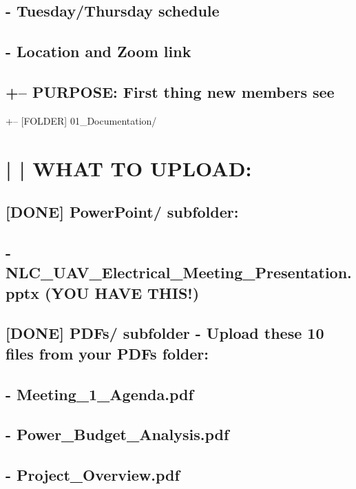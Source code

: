 \documentclass[11pt,letterpaper]{article}
\begin{document}
\subsection*{- Tuesday/Thursday schedule}

\subsection*{- Location and Zoom link}

\subsection*{+-- PURPOSE: First thing new members see}

+-- [FOLDER] 01\_Documentation/\par

\section{|   |   WHAT TO UPLOAD:}

\subsection*{[DONE] PowerPoint/ subfolder:}

\subsection*{- NLC\_UAV\_Electrical\_Meeting\_Presentation.pptx (YOU HAVE THIS!)}

\subsection*{[DONE] PDFs/ subfolder - Upload these 10 files from your PDFs folder:}

\subsection*{- Meeting\_1\_Agenda.pdf}

\subsection*{- Power\_Budget\_Analysis.pdf}

\subsection*{- Project\_Overview.pdf}
\end{document}
